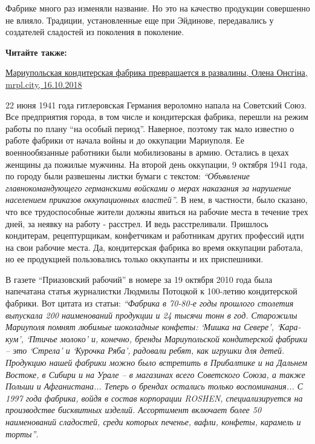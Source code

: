 Фабрике много раз изменяли название. Но это на качество продукции совершенно не
влияло. Традиции, установленные еще при Эйдинове, передавались у создателей
сладостей из поколения в поколение.

\textbf{Читайте также:} 

\href{https://mrpl.city/news/view/mariupolskaya-konditerskaya-fabrika-prevrashhaetsya-v-razvaliny-fotofakt}{%
Мариупольская кондитерская фабрика превращается в развалины, Олена Онєгіна, mrpl.city, 16.10.2018}

22 июня 1941 года гитлеровская Германия вероломно напала на Советский Союз. Все
предприятия города, в том числе и кондитерская фабрика, перешли на режим работы
по плану \enquote{на особый период}. Наверное, поэтому так мало известно о работе
фабрики от начала войны и до оккупации Мариуполя. Ее военнообязанные работники
были мобилизованы в армию. Остались в цехах женщины да пожилые мужчины. На
второй день оккупации, 9 октября 1941 года, по городу были развешены листки
бумаги с текстом: \emph{\enquote{Объявление главнокомандующего германскими войсками о мерах
наказания за нарушение населением приказов оккупационных властей}}. В нем, в
частности, было сказано, что все трудоспособные жители должны явиться на
рабочие места в течение трех дней, за неявку на работу - расстрел. И ведь
расстреливали. Пришлось кондитерам, рецептурщикам, конфетчикам и работникам
других профессий идти на свои рабочие места. Да, кондитерская фабрика во время
оккупации работала, но ее продукцией пользовались только оккупанты и их
приспешники.

В газете \enquote{Приазовский рабочий} в номере за 19 октября 2010 года была напечатана
статья журналистки Людмилы Потоцкой к 100-летию кондитерской фабрики. Вот
цитата из статьи: {\color{blue}\em\enquote{Фабрика в 70-80-е годы прошлого столетия выпускала 200
наименований продукции и 24 тысячи тонн в год. Старожилы Мариуполя помнят
любимые шоколадные конфеты: \enquote{Мишка на Севере}, \enquote{Кара-кум}, \enquote{Птичье молоко} и,
конечно, бренды Мариупольской кондитерской фабрики – это \enquote{Стрела} и \enquote{Курочка
Ряба}, радовали ребят, как игрушки для детей. Продукцию нашей фабрики можно
было встретить в Прибалтике и на Дальнем Востоке, в Сибири и на Урале – в
магазинах всего Советского Союза, а также Польши и Афганистана... Теперь о
брендах остались только воспоминания... С 1997 года фабрика, войдя в состав
корпорации ROSHEN, специализируется на производстве бисквитных изделий.
Ассортимент включает более 50 наименований сладостей, среди которых печенье,
вафли, конфеты, карамель и торты}}. 


